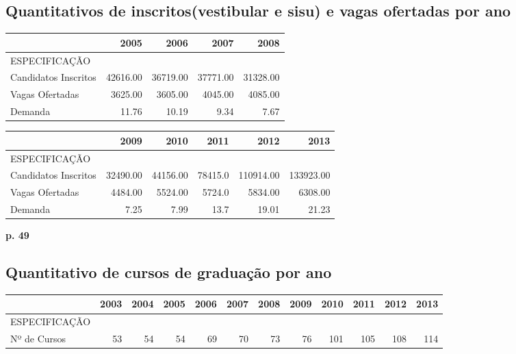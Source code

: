 \documentclass{report}
\begin{document}
\subsection{Quantitativos de inscritos(vestibular e sisu) e vagas ofertadas por ano}
\begin{tabular}{lrrrr}
\toprule
{} &      2005 &      2006 &      2007 &      2008 \\
\midrule
ESPECIFICAÇÃO        &           &           &           &           \\
Candidatos Inscritos &  42616.00 &  36719.00 &  37771.00 &  31328.00 \\
Vagas Ofertadas      &  3625.00 &  3605.00 &  4045.00 &  4085.00 \\
Demanda              &  11.76 &  10.19 &  9.34 &  7.67 \\
\bottomrule
\end{tabular}

\begin{tabular}{lrrrrr}
\toprule
{} &      2009 &      2010 &     2011 &       2012 &       2013 \\
\midrule
ESPECIFICAÇÃO        &           &           &          &            &            \\
Candidatos Inscritos &  32490.00 &  44156.00 &  78415.0 &  110914.00 &  133923.00 \\
Vagas Ofertadas      &  4484.00 &  5524.00 &  5724.0 &  5834.00 &  6308.00 \\
Demanda              &  7.25 &  7.99 &  13.7 &  19.01 &  21.23 \\
\bottomrule
\end{tabular}

\textbf{p. 49}

\subsection{Quantitativo de cursos de graduação por ano}
\begin{tabular}{lrrrrrrrrrrr}
\toprule
{} &  2003 &  2004 &  2005 &  2006 &  2007 &  2008 &  2009 &  2010 &  2011 &  2012 &  2013 \\
\midrule
ESPECIFICAÇÃO &       &       &       &       &       &       &       &       &       &       &       \\
Nº de Cursos  &  53 &  54 &  54 &  69 &  70 &  73 &  76 &  101 &  105 &  108 &  114 \\
\bottomrule
\end{tabular}
\end{document}
